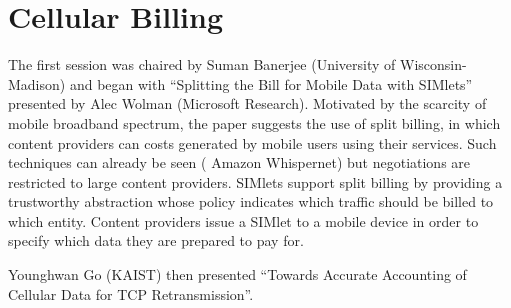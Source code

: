 \section{Cellular Billing}
\label{sec:cellbilling}

The first session was chaired by Suman Banerjee (University of Wisconsin-Madison)
and began with ``Splitting the Bill for Mobile Data with SIMlets'' presented by 
Alec Wolman (Microsoft Research). Motivated by the scarcity of mobile broadband 
spectrum, the paper suggests the use of split billing, in which content providers 
can costs generated by mobile users using their services. Such techniques can 
already be seen (\eg{} Amazon Whispernet) but negotiations are restricted to 
large content providers. SIMlets support split billing by providing a
trustworthy abstraction whose policy indicates which traffic should be billed to 
which entity. Content providers issue a SIMlet to a mobile device in order to 
specify which data they are prepared to pay for.

Younghwan Go (KAIST) then presented ``Towards Accurate Accounting of Cellular 
Data for TCP Retransmission''.